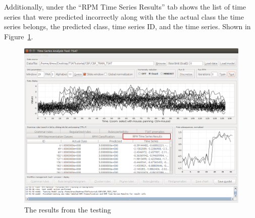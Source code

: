 \documentclass[titlepage, letterpaper, 12pt]{article}
\begin{document}
Additionally, under the ``RPM Time Series Results'' tab shows the list of time series that were predicted incorrectly along with the the actual class the time series belongs, the predicted class, time series ID, and the time series.  Shown in Figure~\ref{fig:TSAT-testing-step-3}.

\begin{figure}[H]
	\includegraphics[width=\textwidth]{TSAT-testing-step-3}
	\caption{The results from the testing}
	\label{fig:TSAT-testing-step-3}
\end{figure}
\end{document}
